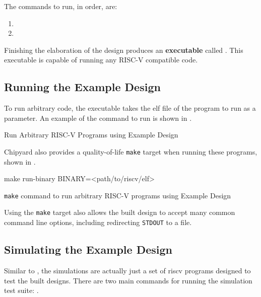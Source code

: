 The commands to run, in order, are:
\begin{enumerate}
\item {}
\item {}
\end{enumerate}

Finishing the \gls{elaboration} of the design produces an \textbf{executable} called .
This executable is capable of running any RISC-V compatible code.

\subsection{Running the Example Design}\label{sec:Running_Example_Design}
To run arbitrary code, the executable takes the \Gls{elf} file of the program to run as a parameter.
An example of the command to run is shown in .

\begin{listing}[h!tbp]
\caption{Run Arbitrary RISC-V Programs using Example Design}
\label{lst:Running_Example_Design}
\end{listing}

Chipyard also provides a quality-of-life \texttt{make} target when running these programs, shown in .

\begin{listing}[h!tbp]
\begin{bashsource}
make run-binary BINARY=<path/to/riscv/elf>
\end{bashsource}
\caption{\texttt{make} command to run arbitrary RISC-V programs using Example Design}
\label{lst:Running_Example_Design-Make}
\end{listing}

Using the \texttt{make} target also allows the built design to accept many common command line options, including redirecting \texttt{STDOUT} to a file.

\subsection{Simulating the Example Design}\label{sec:Simulating_Example_Design}
Similar to , the simulations are actually just a set of \Gls{riscv} programs designed to test the built designs.
There are two main commands for running the simulation test suite: .

